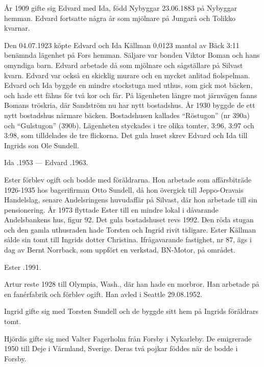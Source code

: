 År 1909 gifte sig Edvard med Ida, född Nybyggar 23.06.1883 på Nybyggar hemman. Edvard fortsatte några år som mjölnare på Jungarå och Tolikko kvarnar.
\begin{jhchildren}
  \item {}
  \item {}
\end{jhchildren}
Den 04.07.1923 köpte Edvard och Ida Källman 0,0123 mantal av Bäck 3:11 benämnda lägenhet på Fors hemman. Säljare var bonden Viktor Boman och hans omyndiga barn. Edvard arbetade då som mjölnare och sågställare på Silvast kvarn. Edvard var också en skicklig murare och en mycket anlitad fiolspelman. Edvard och Ida byggde en mindre stockstuga	med uthus, som gick mot bäcken, och hade ett fähus för två kor och får. På lägenheten längre mot järnvägen fanns Bomans tröskria, där 	Sandström nu har nytt bostadshus. År 1930 byggde de ett nytt bostadshus närmare bäcken. Bostadshusen kallades ``Röstugon'' (nr 390a) och 	``Gulstugon'' (390b). Lägenheten styckades i tre olika tomter, 3:96, 3:97 och 	3:98, som tilldelades de tre flickorna. Det gula huset skrev Edvard och Ida till Ingrids son Ole Sundell.

Ida .1953 --- Edvard .1963.

Ester förblev ogift och bodde med föräldrarna. Hon arbetade som affärsbiträde 1926-1935 hos bagerifirman Otto Sundell, då hon övergick till Jeppo-Oravais Handelslag, senare Andelsringens huvudaffär på Silvast, där hon arbetade till sin pensionering. År 1973 flyttade Ester till en mindre lokal i dåvarande Andelsbankens hus, figur 92. Det gula bostadshuset revs 1992. Den röda stugan och den gamla uthusraden hade Torsten och Ingrid rivit tidigare. Ester Källman sålde sin tomt till Ingrids dotter Christina. Ifrågavarande fastighet, nr 87, ägs i dag av Bernt Norrback, som uppfört en verkstad, BN-Motor, på området.

Ester .1991.

Artur reste 1928 till Olympia, Wash., där han hade en morbror. Han 	arbetade på en fanérfabrik och förblev ogift. Han avled i Seattle 	29.08.1952.

Ingrid gifte sig med Torsten Sundell och de byggde sitt hem på Ingrids föräldrars tomt.

Hjördis gifte sig med Valter Fagerholm från Forsby i Nykarleby. De emigrerade 1950 till Deje i Värmland, Sverige. Deras två pojkar föddes när de bodde i Forsby.



